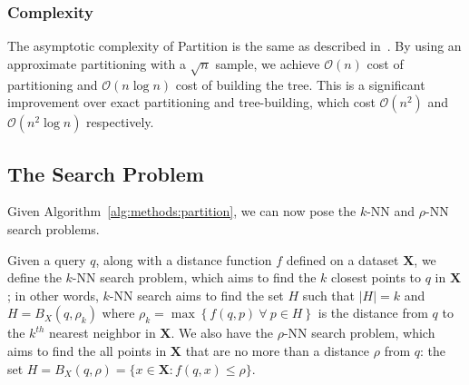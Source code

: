 

\subsubsection{Complexity}
\label{sec:methods:clustering:complexity}

The asymptotic complexity of Partition is the same as described in~\cite{ishaq2019clustered}.
By using an approximate partitioning with a $\sqrt{n}$ sample, we achieve $\mathcal{O}(n)$ cost of partitioning and $\mathcal{O}(n \log n)$ cost of building the tree.
This is a significant improvement over exact partitioning and tree-building, which cost $\mathcal{O}(n^2)$ and $\mathcal{O}(n^2 \log n)$ respectively.


\subsection{The Search Problem}
\label{sec:methods:the-search-problem}

Given Algorithm~\ref{alg:methods:partition}, we can now pose the $k$-NN and $\rho$-NN search problems.

Given a query $q$, along with a distance function $f$ defined on a dataset $\textbf{X}$, we define the $k$-NN search problem, which aims to find the $k$ closest points to $q$ in $\textbf{X}$;
in other words, $k$-NN search aims to find the set $H$ such that $|H| = k$ and $H = B_X(q, \rho_k)$ where $\rho_k = \max \left\{ f(q, p) \ \forall \ p \in H \right\}$ is the distance from $q$ to the $k^{th}$ nearest neighbor in $\textbf{X}$.
We also have the $\rho$-NN search problem, which aims to find the all points in $\textbf{X}$ that are no more than a distance $\rho$ from $q$: the set $H = B_X(q, \rho) = \{x \in \textbf{X}: f(q, x) \leq \rho \}$.

